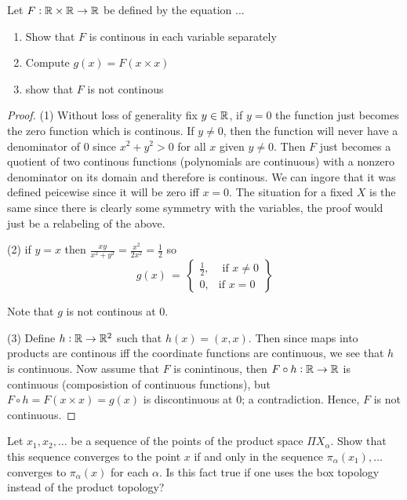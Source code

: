     \question 
    Let $F: \mathbb{R} \times \mathbb{R} \to \mathbb{R}$ be defined by the equation ... 
    \begin{enumerate}
        \item Show that $F$ is continous in each variable separately
        \item Compute $g(x) = F(x \times x)$ 
        \item show that $F$ is not continous
    \end{enumerate}


    \begin{proof}
        (1) Without loss of generality fix $y \in \mathbb{R}$, if $y = 0$ the function just becomes the zero function which is continous. If $y \neq 0$, then the function will never have a denominator of $0$ since $x^2 + y^2 > 0$ for all $x$ given $y \neq 0$. Then $F$ 
        just becomes a quotient of two continous functions (polynomials are continuous) with a nonzero denominator on its domain and therefore is continous. We can ingore that it was defined peicewise since it will be zero iff $x = 0$. The situation for a fixed $X$ is the same since there is clearly some symmetry with the variables, 
        the proof would just be a relabeling of the above. 

        (2) if $y = x$ then $\frac{xy}{x^2 + y^2} = \frac{x^2}{2x^2} = \frac{1}{2}$ so
        \begin{equation}
                g(x) \, = \, 
                \left\{\begin{array}{lr}
                    \frac{1}{2}, & \text{ if } x \neq 0 \\
                    0, & \text{if } x = 0
                \end{array}\right\}
        \end{equation}

        Note that $g$ is not continous at $0$.

        (3) Define $h: \mathbb{R} \to \mathbb{R}^2$ such that $h(x) = (x, x)$. Then since maps into products are continous iff the coordinate functions are continuous, we see that $h$ is continuous. 
        Now assume that $F$ is conintinous, then $F \circ h:\mathbb{R} \to \mathbb{R}$ is continuous (composistion of continuous functions), but $F \circ h = F(x \times x) = g(x)$ is discontinuous at $0$; a contradiction. Hence, $F$ is not continuous. 

    \end{proof}


    \question 
    Let $x_1, x_2, \dots$ be a sequence of the points of the product space $\Pi X_\alpha$. Show that this sequence converges to the point $x$ if and only in the sequence $\pi_\alpha(x_1), \dots$ converges to $\pi_\alpha(x)$ for each $\alpha$. Is this fact true if one uses the 
    box topology instead of the product topology? 

